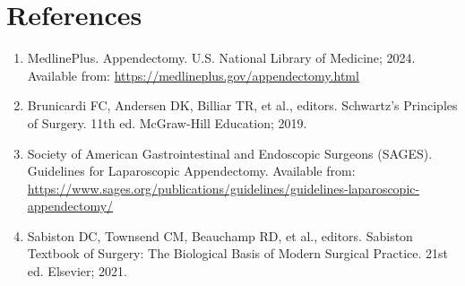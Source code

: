 \section*{References}
\begin{enumerate}
  \item MedlinePlus. Appendectomy. U.S. National Library of Medicine; 2024. Available from: \url{https://medlineplus.gov/appendectomy.html}
  \item Brunicardi FC, Andersen DK, Billiar TR, et al., editors. Schwartz's Principles of Surgery. 11th ed. McGraw-Hill Education; 2019.
  \item Society of American Gastrointestinal and Endoscopic Surgeons (SAGES). Guidelines for Laparoscopic Appendectomy. Available from: \url{https://www.sages.org/publications/guidelines/guidelines-laparoscopic-appendectomy/}
  \item Sabiston DC, Townsend CM, Beauchamp RD, et al., editors. Sabiston Textbook of Surgery: The Biological Basis of Modern Surgical Practice. 21st ed. Elsevier; 2021.
\end{enumerate}

\clearpage
